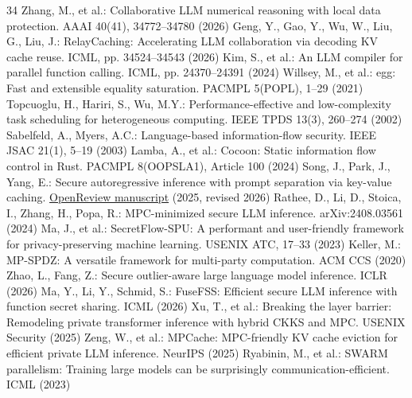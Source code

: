 \documentclass[runningheads]{llncs}
\begin{document}
\begin{thebibliography}{34}
 Zhang, M., et al.: Collaborative LLM numerical reasoning with local data protection. AAAI 40(41), 34772--34780 (2026)
 Geng, Y., Gao, Y., Wu, W., Liu, G., Liu, J.: RelayCaching: Accelerating LLM collaboration via decoding KV cache reuse. ICML, pp. 34524--34543 (2026)
 Kim, S., et al.: An LLM compiler for parallel function calling. ICML, pp. 24370--24391 (2024)
 Willsey, M., et al.: egg: Fast and extensible equality saturation. PACMPL 5(POPL), 1--29 (2021)
 Topcuoglu, H., Hariri, S., Wu, M.Y.: Performance-effective and low-complexity task scheduling for heterogeneous computing. IEEE TPDS 13(3), 260--274 (2002)
 Sabelfeld, A., Myers, A.C.: Language-based information-flow security. IEEE JSAC 21(1), 5--19 (2003)
 Lamba, A., et al.: Cocoon: Static information flow control in Rust. PACMPL 8(OOPSLA1), Article 100 (2024)
 Song, J., Park, J., Yang, E.: Secure autoregressive inference with prompt separation via key-value caching. \href{https://openreview.net/forum?id=tFNsosNMHT}{OpenReview manuscript} (2025, revised 2026)
 Rathee, D., Li, D., Stoica, I., Zhang, H., Popa, R.: MPC-minimized secure LLM inference. arXiv:2408.03561 (2024)
 Ma, J., et al.: SecretFlow-SPU: A performant and user-friendly framework for privacy-preserving machine learning. USENIX ATC, 17--33 (2023)
 Keller, M.: MP-SPDZ: A versatile framework for multi-party computation. ACM CCS (2020)
 Zhao, L., Fang, Z.: Secure outlier-aware large language model inference. ICLR (2026)
 Ma, Y., Li, Y., Schmid, S.: FuseFSS: Efficient secure LLM inference with function secret sharing. ICML (2026)
 Xu, T., et al.: Breaking the layer barrier: Remodeling private transformer inference with hybrid CKKS and MPC. USENIX Security (2025)
 Zeng, W., et al.: MPCache: MPC-friendly KV cache eviction for efficient private LLM inference. NeurIPS (2025)
 Ryabinin, M., et al.: SWARM parallelism: Training large models can be surprisingly communication-efficient. ICML (2023)
\end{thebibliography}
\end{document}
